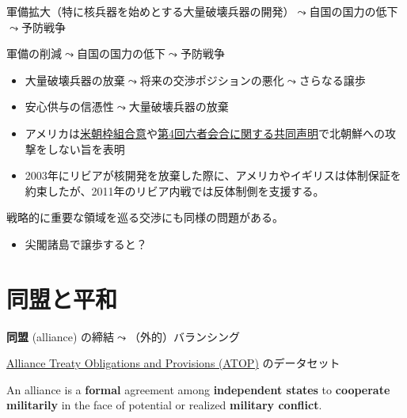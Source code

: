\documentclass[
  xelatex,
  ja=standard]{bxjsarticle}
\providecommand{\tightlist}{%
  \setlength{\itemsep}{0pt}\setlength{\parskip}{0pt}}\usepackage{longtable,booktabs,array}
\begin{document}
軍備拡大（特に核兵器を始めとする大量破壊兵器の開発）\(\leadsto\)自国の国力の低下\(\leadsto\)予防戦争

軍備の削減\(\leadsto\)自国の国力の低下\(\leadsto\)予防戦争

\begin{itemize}
\tightlist
\item
  大量破壊兵器の放棄\(\leadsto\)将来の交渉ポジションの悪化\(\leadsto\)さらなる譲歩
\item
  安心供与の信憑性\(\leadsto\)大量破壊兵器の放棄
\item
  アメリカは\href{https://peacemaker.un.org/node/1129}{米朝枠組合意}や\href{https://www.mofa.go.jp/mofaj/area/n_korea/6kaigo/ks_050919.html}{第4回六者会合に関する共同声明}で北朝鮮への攻撃をしない旨を表明
\item
  2003年にリビアが核開発を放棄した際に、アメリカやイギリスは体制保証を約束したが、2011年のリビア内戦では反体制側を支援する。
\end{itemize}

戦略的に重要な領域を巡る交渉にも同様の問題がある。

\begin{itemize}
\tightlist
\item
  尖閣諸島で譲歩すると？
\end{itemize}

\hypertarget{ux540cux76dfux3068ux5e73ux548c}{%
\section{同盟と平和}\label{ux540cux76dfux3068ux5e73ux548c}}

\textbf{同盟} (alliance) の締結\(\leadsto\)（外的）バランシング

\href{http://www.atopdata.org/}{Alliance Treaty Obligations and
Provisions (ATOP)} のデータセット\citep{leeds2002}

\begin{tcolorbox}[enhanced jigsaw, left=2mm, coltitle=black, bottomtitle=1mm, colback=white, titlerule=0mm, breakable, leftrule=.75mm, opacitybacktitle=0.6, rightrule=.15mm, colbacktitle=quarto-callout-note-color!10!white, arc=.35mm, colframe=quarto-callout-note-color-frame, title=\textcolor{quarto-callout-note-color}{\faInfo}\hspace{0.5em}{\href{http://www.atopdata.org/uploads/6/9/1/3/69134503/atop_5_1_codebook.pdf}{ATOPにおける同盟の定義}}, toptitle=1mm, toprule=.15mm, bottomrule=.15mm, opacityback=0]

An alliance is a \textbf{formal} agreement among \textbf{independent
states} to \textbf{cooperate militarily} in the face of potential or
realized \textbf{military conflict}.

\end{tcolorbox}
\end{document}
